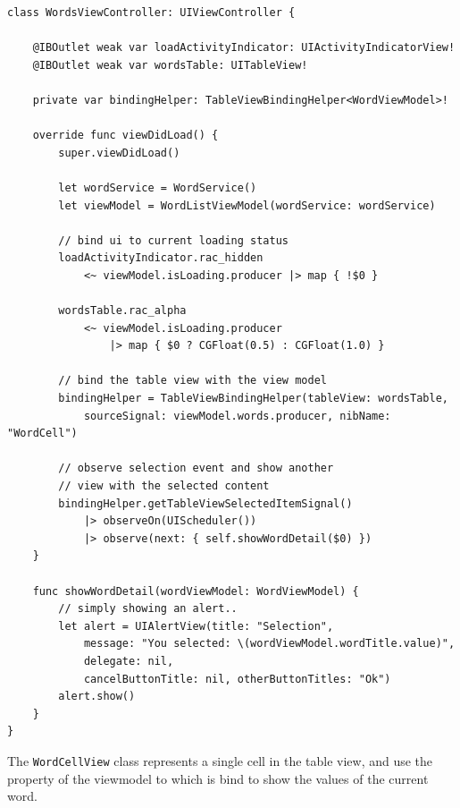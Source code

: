 \begin{verbatim}
class WordsViewController: UIViewController {

    @IBOutlet weak var loadActivityIndicator: UIActivityIndicatorView!
    @IBOutlet weak var wordsTable: UITableView!

    private var bindingHelper: TableViewBindingHelper<WordViewModel>!

    override func viewDidLoad() {
        super.viewDidLoad()

        let wordService = WordService()
        let viewModel = WordListViewModel(wordService: wordService)

        // bind ui to current loading status
        loadActivityIndicator.rac_hidden
            <~ viewModel.isLoading.producer |> map { !$0 }

        wordsTable.rac_alpha
            <~ viewModel.isLoading.producer 
            	|> map { $0 ? CGFloat(0.5) : CGFloat(1.0) }

        // bind the table view with the view model
        bindingHelper = TableViewBindingHelper(tableView: wordsTable,
            sourceSignal: viewModel.words.producer, nibName: "WordCell")

        // observe selection event and show another 
        // view with the selected content
        bindingHelper.getTableViewSelectedItemSignal()
            |> observeOn(UIScheduler())
            |> observe(next: { self.showWordDetail($0) })
    }

    func showWordDetail(wordViewModel: WordViewModel) {
        // simply showing an alert..
        let alert = UIAlertView(title: "Selection",
            message: "You selected: \(wordViewModel.wordTitle.value)",
            delegate: nil,
            cancelButtonTitle: nil, otherButtonTitles: "Ok")
        alert.show()
    }
}
\end{verbatim}

The \texttt{WordCellView} class represents a single cell in the table
view, and use the property of the viewmodel to which is bind to show the
values of the current word.

